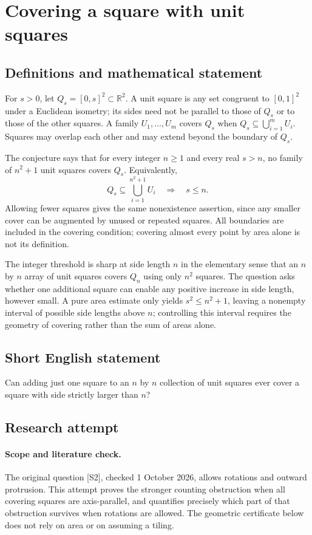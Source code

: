\documentclass[11pt,a4paper]{article}
\begin{document}
\section*{Covering a square with unit squares}\label{statement}

\subsection{Definitions and mathematical statement}
For $s>0$, let $Q_s=[0,s]^2\subset\mathbb R^2$.
A unit square is any set congruent to $[0,1]^2$ under a Euclidean isometry;
its sides need not be parallel to those of $Q_s$ or to those of the
other squares. A family $U_1,\ldots,U_m$ covers $Q_s$ when
$Q_s\subseteq\bigcup_{i=1}^m U_i$. Squares may overlap each other and
may extend beyond the boundary of $Q_s$.

The conjecture says that for every integer $n\ge1$ and every real
$s>n$, no family of $n^2+1$ unit squares covers $Q_s$. Equivalently,
\[
 Q_s\subseteq\bigcup_{i=1}^{n^2+1}U_i
       \quad\Longrightarrow\quad s\le n.
\]
Allowing fewer squares gives the same nonexistence assertion, since any
smaller cover can be augmented by unused or repeated squares. All boundaries
are included in the covering condition; covering almost every point by
area alone is not its definition.

The integer threshold is sharp at side length $n$ in the elementary
sense that an $n$ by $n$ array of unit squares covers $Q_n$ using only
$n^2$ squares. The question asks whether one additional square can enable
any positive increase in side length, however small. A pure area estimate
only yields $s^2\le n^2+1$, leaving a nonempty interval of possible side
lengths above $n$; controlling this interval requires the geometry of
covering rather than the sum of areas alone.
\subsection{Short English statement}
Can adding just one square to an $n$ by $n$ collection of unit squares ever cover a square with side strictly larger than $n$?
\subsection{Research attempt}
\paragraph{Scope and literature check.}
The original question [S2], checked 1 October 2026, allows rotations and
outward protrusion. This attempt proves the stronger counting obstruction
when all covering squares are axis-parallel, and quantifies precisely which
part of that obstruction survives when rotations are allowed. The geometric
certificate below does not rely on area or on assuming a tiling.
\end{document}
